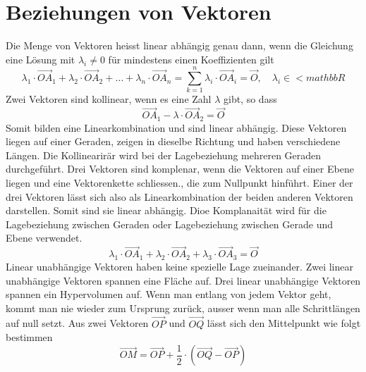 \section{Beziehungen von Vektoren}
Die Menge von Vektoren heisst linear abhängig genau dann, wenn die Gleichung eine Lösung mit $\lambda_i\neq 0$ für mindestens einen Koeffizienten gilt
\begin{equation}
\boxed{\lambda_1\cdot \overrightarrow{OA}_1+\lambda_2\cdot \overrightarrow{OA}_2+\dotso+\lambda_n\cdot \overrightarrow{OA}_n=\displaystyle \sum_{k=1}^n\lambda_i\cdot \overrightarrow{OA}_i=\overrightarrow{O},\quad \lambda_i\in <mathbb{R}}
\end{equation}
Zwei Vektoren sind kollinear, wenn es eine Zahl $\lambda$ gibt, so dass
\begin{equation}
\boxed{\overrightarrow{OA}_1-\lambda\cdot \overrightarrow{OA}_2=\overrightarrow{O}}
\end{equation}
Somit bilden eine Linearkombination und sind linear abhängig. Diese Vektoren liegen auf einer Geraden, zeigen in dieselbe Richtung und haben verschiedene Längen. Die Kollinearirär wird bei der Lagebeziehung mehreren Geraden durchgeführt.
\newline\newline
Drei Vektoren sind komplenar, wenn die Vektoren auf einer Ebene liegen und eine Vektorenkette schliessen., die zum Nullpunkt hinführt. Einer der drei Vektoren lässt sich also als Linearkombination der beiden anderen Vektoren darstellen. Somit sind sie linear abhängig. Dioe Komplanaität wird für die Lagebeziehung zwischen Geraden oder Lagebeziehung zwischen Gerade und Ebene verwendet.
\begin{equation}
\boxed{\lambda_1\cdot \overrightarrow{OA}_1+\lambda_2\cdot \overrightarrow{OA}_2+\lambda_3\cdot \overrightarrow{OA}_3=\overrightarrow{O}}
\end{equation}
Linear unabhängige Vektoren haben keine spezielle Lage zueinander. Zwei linear unabhängige Vektoren spannen eine Fläche auf. Drei linear unabhängige Vektoren spannen ein Hypervolumen auf. Wenn man entlang von jedem Vektor geht, kommt man nie wieder zum Ursprung zurück, ausser wenn man alle Schrittlängen auf null setzt.
\newline\newline
Aus zwei Vektoren $\overrightarrow{OP}$ und $\overrightarrow{OQ}$ lässt sich den Mittelpunkt wie folgt bestimmen
\begin{equation}
\boxed{\overrightarrow{OM}=\overrightarrow{OP}+\dfrac{1}{2}\cdot\left(\overrightarrow{OQ}-\overrightarrow{OP}\right)}
\end{equation}
